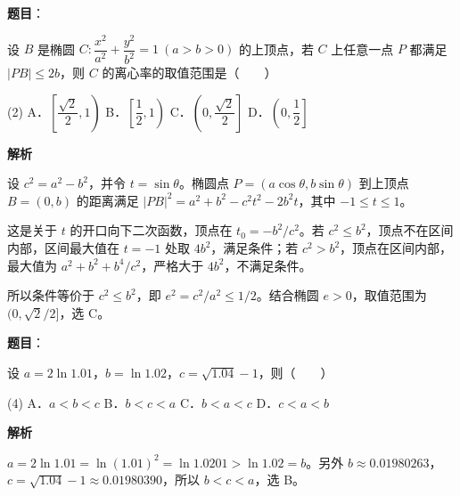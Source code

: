 \begin{answer}

\textbf{题目}：

设 $B$ 是椭圆 $C:\dfrac{x^2}{a^2}+\dfrac{y^2}{b^2}=1\ (a>b>0)$ 的上顶点，若 $C$ 上任意一点 $P$ 都满足 $|PB|\leqslant2b$，则 $C$ 的离心率的取值范围是\mbox{（　　）}

\begin{gkopts}(2)
\task A．$\left[\dfrac{\sqrt2}{2},1\right)$
\task B．$\left[\dfrac12,1\right)$
\task C．$\left(0,\dfrac{\sqrt2}{2}\right]$
\task D．$\left(0,\dfrac12\right]$
\end{gkopts}

\textbf{解析}

设 $c^2=a^2-b^2$，并令 $t=\sin\theta$。椭圆点 $P=(a\cos\theta,b\sin\theta)$ 到上顶点 $B=(0,b)$ 的距离满足
$|PB|^2=a^2+b^2-c^2t^2-2b^2t$，其中 $-1\leqslant t\leqslant1$。

这是关于 $t$ 的开口向下二次函数，顶点在 $t_0=-b^2/c^2$。若 $c^2\leqslant b^2$，顶点不在区间内部，区间最大值在 $t=-1$ 处取 $4b^2$，满足条件；若 $c^2>b^2$，顶点在区间内部，最大值为 $a^2+b^2+b^4/c^2$，严格大于 $4b^2$，不满足条件。

所以条件等价于 $c^2\leqslant b^2$，即 $e^2=c^2/a^2\leqslant1/2$。结合椭圆 $e>0$，取值范围为 $(0,\sqrt2/2]$，选 C。


\end{answer}
\begin{answer}

\textbf{题目}：

设 $a=2\ln1.01$，$b=\ln1.02$，$c=\sqrt{1.04}-1$，则\mbox{（　　）}

\begin{gkopts}(4)
\task A．$a<b<c$
\task B．$b<c<a$
\task C．$b<a<c$
\task D．$c<a<b$
\end{gkopts}

\textbf{解析}

$a=2\ln1.01=\ln(1.01)^2=\ln1.0201>\ln1.02=b$。另外
$b\approx0.01980263$，$c=\sqrt{1.04}-1\approx0.01980390$，所以 $b<c<a$，选 B。


\par\medskip

\end{answer}


